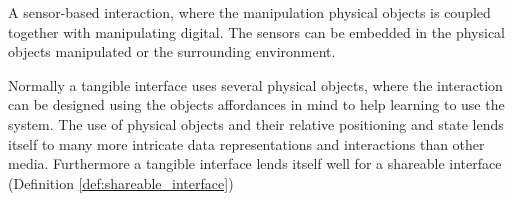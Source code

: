 \begin{definition} \label{def:tangible_interface} 
  A sensor-based interaction, where the manipulation physical objects is coupled together with manipulating digital. The sensors can be embedded in the physical objects manipulated or the surrounding environment.

  Normally a tangible interface uses several physical objects, where the interaction can be designed using the objects affordances in mind to help learning to use the system. The use of physical objects and their relative positioning and state lends itself to many more intricate data representations and interactions than other media. Furthermore a tangible interface lends itself well for a shareable interface (Definition \ref{def:shareable_interface}) \cite[p. 205-206]{rogers}
\end{definition}